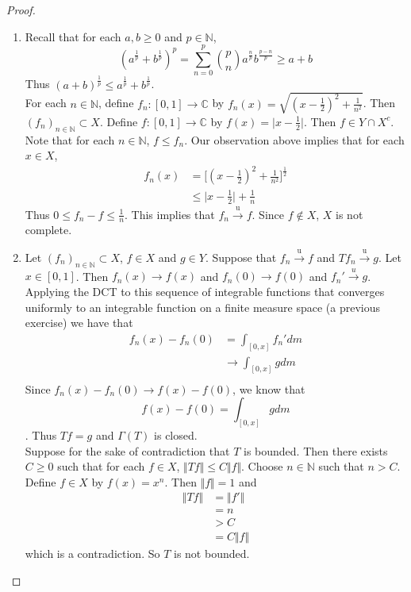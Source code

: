 \documentclass[12pt]{amsart}
\newcommand{\Gam}{\Gamma}
\newcommand{\C}{\mathbb{C}}
\newcommand{\N}{\mathbb{N}}
\newcommand{\convt}[1]{\xrightarrow{\text{#1}}}
\newcommand{\conv}[1]{\xrightarrow{#1}}
\newcommand{\n}{\Vert}
\begin{document}
\begin{proof}
\begin{enumerate}
\item Recall that for each $a,b \geq 0$ and $p \in \N$, $$(a^{\frac{1}{p}}+b^{\frac{1}{p}})^p = \sum_{n=0}^p  {p \choose n} a^{\frac{n}{p}}b^{\frac{p-n}{p}} \geq a + b$$ Thus $(a+b)^{\frac{1}{p}} \leq a^{\frac{1}{p}}+b^{\frac{1}{p}}$.\\
For each $n \in \N$, define $f_n: [0,1] \rightarrow \C$ by $f_n(x) = \sqrt{(x-\frac{1}{2})^2+ \frac{1}{n^2}}$. Then $(f_n)_{n \in \N} \subset X$. Define $f:[0,1] \rightarrow \C$ by $f(x) = \vert x-\frac{1}{2}\vert$. Then $f \in Y \cap X^c$. Note that for each $n \in \N$, $f \leq f_n$. Our observation above implies that for each $x \in X$,
\begin{align*}
f_n(x) 
&= \bigg[ (x-\frac{1}{2})^2 + \frac{1}{n^2} \bigg]^{\frac{1}{2}}\\
& \leq \vert x-\frac{1}{2} \vert + \frac{1}{n}
\end{align*}
Thus $0 \leq f_n - f \leq \frac{1}{n} $. This implies that $f_n \convt{u} f$. Since $f \not \in X$, $X$ is not complete. \vspace{.5cm}\\
\item Let $(f_n)_{n \in \N} \subset X$, $f \in X$ and $g \in Y$. Suppose that $f_n \convt{u} f$ and $Tf_n \convt{u} g$. Let $x \in [0,1]$. Then $f_n(x) \conv{} f(x)$ and $f_n(0) \conv{} f(0)$ and $f_n' \conv{u} g$. Applying the DCT to this sequence of integrable functions that converges uniformly to an integrable function on a finite measure space (a previous exercise) we have that
\begin{align*}
f_n(x) - f_n(0) 
&= \int_{[0,x]} f_n' dm \\
& \conv{} \int_{[0,x]} g dm \\ 
\end{align*} 
Since $f_n(x) - f_n(0) \conv{} f(x) - f(0)$, we know that $$f(x) - f(0) = \int_{[0,x]} g dm$$. Thus $Tf = g$ and $\Gam(T)$ is closed. \\
Suppose for the sake of contradiction that $T$ is bounded. Then there exists $C \geq 0$ such that for each $f \in X$, $\n T f \n \leq C \n f \n$. Choose $n \in \N$ such that $n > C$. Define $f \in X$ by $f(x) = x^n$. Then $\n f \n = 1$ and 
\begin{align*}
\n Tf \n 
&= \n f' \n \\
&= n \\
&> C \\
&= C \n f \n
\end{align*}
which is a contradiction. So $T$ is not bounded.
\end{enumerate}
\end{proof}
\end{document}
